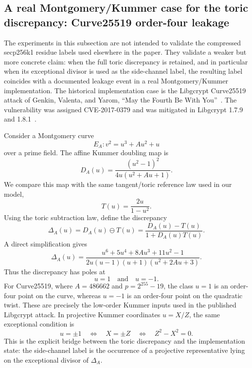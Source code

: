 \subsection{A real Montgomery/Kummer case for the toric discrepancy: Curve25519 order-four leakage}
\label{subsec:curve25519-discrepancy-experiment}

The experiments in this subsection are not intended to validate the compressed
secp256k1 residue labels used elsewhere in the paper.  They validate a weaker
but more concrete claim: when the full toric discrepancy is retained, and in
particular when its exceptional divisor is used as the side-channel label, the
resulting label coincides with a documented leakage event in a real
Montgomery/Kummer implementation.  The historical implementation case is the
Libgcrypt Curve25519 attack of Genkin, Valenta, and Yarom, ``May the Fourth Be
With You''~\cite{genkin2017mayfourth}.  The vulnerability was assigned
CVE-2017-0379 and was mitigated in Libgcrypt 1.7.9 and 1.8.1~\cite{gnupg2017cve0379,nvd2017cve0379}.

Consider a Montgomery curve
\[
  E_A : v^2 = u^3 + A u^2 + u
\]
over a prime field.  The affine Kummer doubling map is
\[
  D_A(u)=\frac{(u^2-1)^2}{4u(u^2+Au+1)}.
\]
We compare this map with the same tangent/toric reference law used in our
model,
\[
  T(u)=\frac{2u}{1-u^2}.
\]
Using the toric subtraction law, define the discrepancy
\[
  \Delta_A(u)=D_A(u)\ominus T(u)
  =\frac{D_A(u)-T(u)}{1+D_A(u)T(u)}.
\]
A direct simplification gives
\[
  \Delta_A(u)=
  \frac{u^6+5u^4+8Au^3+11u^2-1}
       {2u(u-1)(u+1)(u^2+2Au+3)} .
\]
Thus the discrepancy has poles at
\[
  u=1 \quad\text{and}\quad u=-1 .
\]
For Curve25519, where \(A=486662\) and \(p=2^{255}-19\), the class \(u=1\) is
an order-four point on the curve, whereas \(u=-1\) is an order-four point on the
quadratic twist.  These are precisely the low-order Kummer inputs used in the
published Libgcrypt attack.  In projective Kummer coordinates \(u=X/Z\), the
same exceptional condition is
\[
  u=\pm 1 \quad\Longleftrightarrow\quad X=\pm Z
  \quad\Longleftrightarrow\quad Z^2-X^2=0 .
\]
This is the explicit bridge between the toric discrepancy and the implementation
state: the side-channel label is the occurrence of a projective representative
lying on the exceptional divisor of \(\Delta_A\).

